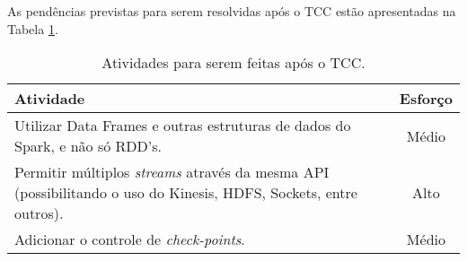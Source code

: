 As pendências previstas para serem resolvidas após o TCC estão apresentadas
na Tabela \ref{tab:apos}.

\begin{table}[h]
  \begin{center}
  \caption{Atividades para serem feitas após o TCC.}
  \label{tab:apos}
    \begin{tabular}{|p{12cm}|c|}
        \hline \textbf{Atividade}  & \textbf{Esforço} \\

        \hline Utilizar Data Frames e outras estruturas de dados do
        Spark, e não só RDD's. & Médio \\

        \hline Permitir múltiplos \textit{streams} através da mesma
        API (possibilitando o uso do Kinesis, HDFS, Sockets, entre outros).
          & Alto \\

        \hline Adicionar o controle de \textit{check-points}. 
            & Médio \\

      \hline
    \end{tabular}
  \end{center}
\end{table}

